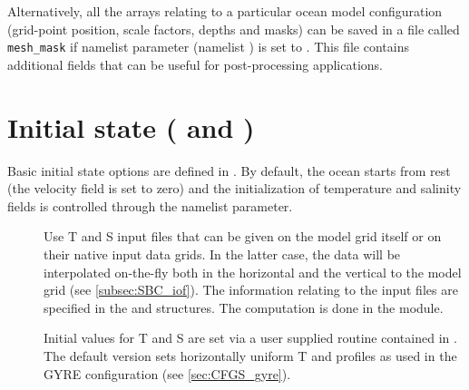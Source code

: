 \documentclass[../main/NEMO_manual]{subfiles}
\begin{document}
Alternatively, all the arrays relating to a particular ocean model configuration
(grid-point position, scale factors, depths and masks) can be saved in
a file called \texttt{mesh\_mask} if
namelist parameter  (namelist ) is set to
.
This file contains additional fields that can be useful for post-processing applications.

\section[Initial state (\textit{istate.F90} and \textit{dtatsd.F90})]{Initial state (\protect{} and \protect{})}
\label{sec:DOM_DTA_tsd}

\begin{listing}
  \caption{}
  \label{lst:namtsd}
\end{listing}

Basic initial state options are defined in .
By default, the ocean starts from rest (the velocity field is set to zero) and
the initialization of temperature and salinity fields is controlled through the  namelist parameter.

\begin{description}
\item [{}] Use T and S input files that can be given on
  the model grid itself or on their native input data grids.
  In the latter case,
  the data will be interpolated on-the-fly both in the horizontal and the vertical to the model grid
  (see \autoref{subsec:SBC_iof}).
  The information relating to the input files are specified in
  the  and  structures.
  The computation is done in the  module.
\item [{}] Initial values for T and S are set via
  a user supplied  routine contained in .
  The default version sets horizontally uniform T and profiles as used in the GYRE configuration
  (see \autoref{sec:CFGS_gyre}).
\end{description}

\subinc{}
\end{document}
